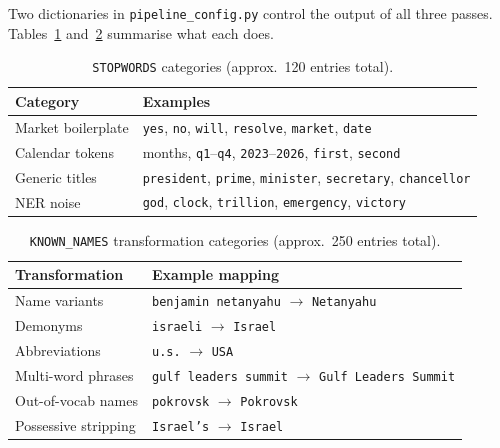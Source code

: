 \documentclass[11pt,a4paper]{article}
\begin{document}
Two dictionaries in \texttt{pipeline\_config.py} control the output
of all three passes. Tables~\ref{tab:stopwords}
and~\ref{tab:known_names} summarise what each does.

\begin{table}[H]
\centering
\caption{\texttt{STOPWORDS} categories (approx.\ 120 entries total).}
\label{tab:stopwords}
\small
\begin{tabularx}{\textwidth}{l X}
\toprule
\textbf{Category} & \textbf{Examples} \\
\midrule
Market boilerplate & \texttt{yes}, \texttt{no}, \texttt{will},
                     \texttt{resolve}, \texttt{market}, \texttt{date} \\
Calendar tokens    & months, \texttt{q1}–\texttt{q4},
                     \texttt{2023}–\texttt{2026}, \texttt{first},
                     \texttt{second} \\
Generic titles     & \texttt{president}, \texttt{prime},
                     \texttt{minister}, \texttt{secretary},
                     \texttt{chancellor} \\
NER noise          & \texttt{god}, \texttt{clock}, \texttt{trillion},
                     \texttt{emergency}, \texttt{victory} \\
\bottomrule
\end{tabularx}
\end{table}

\begin{table}[H]
\centering
\caption{\texttt{KNOWN\_NAMES} transformation categories
         (approx.\ 250 entries total).}
\label{tab:known_names}
\small
\begin{tabularx}{\textwidth}{l X}
\toprule
\textbf{Transformation} & \textbf{Example mapping} \\
\midrule
Name variants       & \texttt{benjamin netanyahu} $\rightarrow$ \texttt{Netanyahu} \\
Demonyms            & \texttt{israeli}            $\rightarrow$ \texttt{Israel}    \\
Abbreviations       & \texttt{u.s.}               $\rightarrow$ \texttt{USA}       \\
Multi-word phrases  & \texttt{gulf leaders summit} $\rightarrow$ \texttt{Gulf Leaders Summit} \\
Out-of-vocab names  & \texttt{pokrovsk}           $\rightarrow$ \texttt{Pokrovsk}  \\
Possessive stripping & \texttt{Israel's}          $\rightarrow$ \texttt{Israel}   \\
\bottomrule
\end{tabularx}
\end{table}
\end{document}
